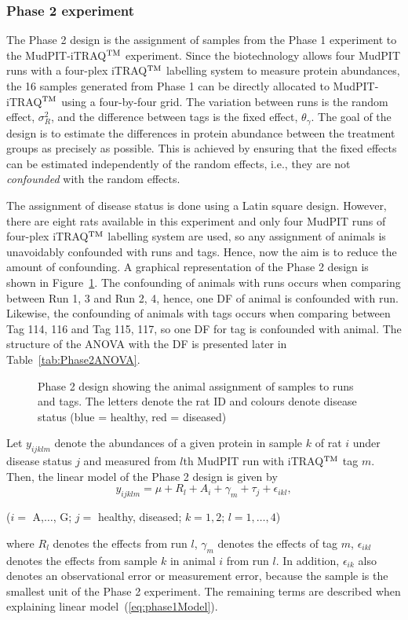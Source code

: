 \documentclass[article]{jss}
\begin{document}
\subsubsection{Phase 2 experiment}
The Phase 2 design is the assignment of samples from the Phase 1 experiment to the MudPIT-iTRAQ$^{\rm TM}$ experiment. Since the biotechnology allows four MudPIT runs with a four-plex iTRAQ$^{\rm TM}$ labelling system to measure protein abundances, the 16 samples generated from Phase 1 can be directly allocated to MudPIT-iTRAQ$^{\rm TM}$ using a four-by-four grid. The variation between runs is the random effect, $\sigma_{R}^2$, and the difference between tags is the fixed effect, $\theta_{\gamma}$. The goal of the design is to estimate the differences in protein abundance between the treatment groups as precisely as possible. This is achieved by ensuring that the fixed effects can be estimated independently of the random effects, i.e., they are not \emph{confounded} with the random effects. 

The assignment of disease status is done using a Latin square design. However, there are eight rats available in this experiment and only four MudPIT runs of four-plex iTRAQ$^{\rm TM}$ labelling system are used, so any assignment of animals is unavoidably confounded with runs and tags. Hence, now the aim is to reduce the amount of confounding. A graphical representation of the Phase 2 design is shown in Figure~\ref{fig:phase2Design}. The confounding of animals with runs occurs when comparing between Run 1, 3 and Run 2, 4, hence, one DF of animal is confounded with run. Likewise, the confounding of animals with tags occurs when comparing between Tag 114, 116 and Tag 115, 117, so one DF for tag is confounded with animal. The structure of the ANOVA with the DF is presented later in Table~\ref{tab:Phase2ANOVA}.

\begin{figure}[hbt]
\caption{Phase 2 design showing the animal assignment of samples to runs and tags. The letters denote the rat ID and colours denote disease status (blue = healthy, red = diseased)}
\label{fig:phase2Design}
\end{figure}

Let $y_{ijklm}$ denote the abundances of a given protein in sample $k$ of rat $i$ under disease status $j$ and measured from $l$th MudPIT run with iTRAQ$^{\rm TM}$ tag $m$. Then, the linear model of the Phase 2 design is given by
\begin{equation}\label{eq:phase2Model}
y_{ijklm}= \mu + R_{l} + A_{i}+ \gamma_{m} + \tau_{j} + \epsilon_{ikl},
\end{equation}
\begin{center}
($i=$ A,$\dots$, G; $j=$ healthy, diseased; $k=1,2$; $l = 1,\dots, 4$)
\end{center}
where $R_{l}$ denotes the effects from run $l$, $\gamma_{m}$ denotes the effects of tag $m$, $\epsilon_{ikl}$ denotes the effects from sample $k$ in animal $i$ from run $l$. In addition, $\epsilon_{ik}$ also denotes an observational error or measurement error, because the sample is the smallest unit of the Phase 2 experiment. The remaining terms are described when explaining linear model~(\ref{eq:phase1Model}).
\end{document}

